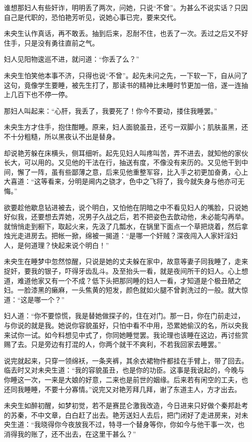 \documentclass[a4paper,12pt,UTF8,twoside]{ctexbook}
\begin{document}
谁想那妇人有些奸诈，明明丢了两次，问她，只说“不曾”。为甚么不说实话？只因自己是代职的，恐怕艳芳听见，说她心事已完，要来交代。

未央生认作真话，再不敢丢。抽到后来，忍耐不住，也丢了一次。丢过之后又不好住手，只是没有勇往直前之气。

妇人见阳物逡巡不进，就问道：“你丢了么？”

未央生怕笑他本事不济，只得也说“不曾”。起先未问之先，一下软一下，自从问了这句，竟像学生要睡，被先生打了，那读书的精神比未睡时节更加一倍，遂一连抽上几百下也不停一停。

那妇人叫起来：“心肝，我丢了，我要死了！你今不要动，搂住我睡罢。”

未央生方才住手，抱住酣睡。原来，妇人面貌虽丑，还亏一双脚小；肌肤虽黑，还不十分粗糙，所以黑夜认不出是替身。

却说艳芳躲在床横头，侧耳细听。起先见妇人叫疼叫苦，弄不进去，就知他的家伙长大，可以用的。又见他的干法在行，抽送有度，不像没有来历的。又见他干到中间，懈了一阵，虽有些鄙薄之意，后来见他重整军容，比入手之初更加奋勇，心上大喜道：“这等看来，分明是阃内之骁才，色中之飞将了，我今就失身与他亦可无悔。”

欲要趁他歇息钻进被去，说个明白，又怕他在阴暗之中不看见妇人的嘴脸，只说她好似我，还要想去弄她，况男子久战之后，若不把姿色去歆动他，未必能勾再举。就悄悄走到橱下，取起火来，先汲了几瓢水，在锅里下面点一个草把烧着，然后拿烛光走进房去。把帐一掀，绵被一揭道：“是哪一个奸贼？深夜闯入人家奸淫妇人，是何道理？快起来说个明白！”

未央生在睡梦中忽然惊醒，只说是她的丈夫躲在家中，故意等妻子同我睡了，走来捉奸，要我的银子，吓得牙齿乱斗。及至抬头一看，就是夜间所干的妇人。心上想道，难道他家又有一个不成？低下头把那同睡的妇人一看，才知道是个极丑陋之妇。一脸漆黑的癞麻，一头焦黄的短发，颜色就如火腿不曾剥洗过的一般。就大惊道：“这是哪一个？”

妇人道：“你不要惊慌，我是替她做探子的，住在对门。那一日，你在门前走过，与你说的就是我。她说你容貌虽好，只怕中看不中用，恐累她偷汉的名，所以央我来试你一试。如今料想见中式了，你同她睡觉罢。我论理也该睡在这边，再讨些赏赐了去。只是旁边有打混的人，你两个就干不爽利，不若我回家去睡罢。”

说完就起来，只穿一领绵袄，一条夹裤，其余衣裙物件都挂在手臂上，带了回去。临去时又对未央生道：“我的容貌虽丑，也是你的功臣。这事是我说起的，今晚与你睡这一次，一来是大娘的好意，二来也是前世的姻缘。后来若有闲空的工夫，也还同我睡睡，不要十分寡情。”说完又对艳芳拜几拜，谢了东道主人，方才出去。

未央生如醉初醒，如梦初觉，若不是赛昆仑激我改造，今日进来只好做个秦邦赴考的苏秦，不中文章，白白赶了出去。艳芳送妇人去后，把门闭好了走进房来，对未央生道：“我晓得你今夜放我不过，特寻一个替身等你，你如今与他干事一次，也消得我的账了，还不出去，在这里干甚么？”
\end{document}
